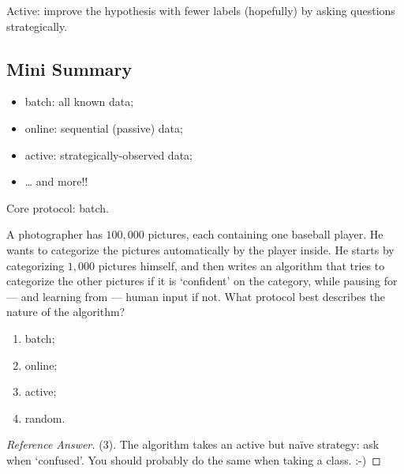 \begin{moral}
    Active: improve the hypothesis with fewer labels (hopefully) by asking
    questions strategically.
\end{moral}

\subsection{Mini Summary}

\begin{note}
    \hfill
    \begin{itemize}
        \item batch: all known data;
        \item online: sequential (passive) data;
        \item active: strategically-observed data;
        \item \ldots{} and more!!
    \end{itemize}
\end{note}

\begin{moral}
    Core protocol: batch.
\end{moral}

\begin{exercise}
    A photographer has \(100{,}000\) pictures, each containing one baseball
    player. He wants to categorize the pictures automatically by the player
    inside. He starts by categorizing \(1{,}000\) pictures himself, and then
    writes an algorithm that tries to categorize the other pictures if it is
    `confident' on the category, while pausing for --- and learning from ---
    human input if not. What protocol best describes the nature of the
    algorithm?
    \begin{enumerate}[(1)]
        \item batch;
        \item online;
        \item active;
        \item random.
    \end{enumerate}
\end{exercise}

\begin{proof}[Reference Answer]
    (3). The algorithm takes an active but naïve strategy: ask when `confused'.
    You should probably do the same when taking a class. :-)
\end{proof}

